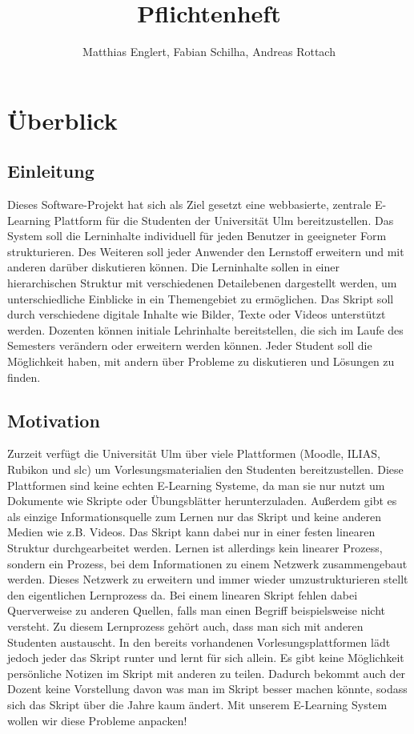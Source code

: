 \documentclass[12pt,a4paper]{article}
\author{Matthias Englert, Fabian Schilha, Andreas Rottach}
\title{Pflichtenheft}
\begin{document}
\maketitle
\newpage
\tableofcontents
\newpage
\section{Überblick}
\subsection{Einleitung}
Dieses Software-Projekt hat sich als Ziel gesetzt eine webbasierte, zentrale E-Learning Plattform für die Studenten der Universität Ulm bereitzustellen. Das System soll die Lerninhalte individuell für jeden Benutzer in geeigneter Form strukturieren. Des Weiteren soll jeder Anwender den Lernstoff erweitern und mit anderen darüber diskutieren können. Die Lerninhalte sollen in einer hierarchischen Struktur mit verschiedenen Detailebenen dargestellt werden, um unterschiedliche Einblicke in ein Themengebiet zu ermöglichen. Das Skript soll durch verschiedene digitale Inhalte wie Bilder, Texte oder Videos unterstützt werden. Dozenten können initiale Lehrinhalte bereitstellen, die sich im Laufe des Semesters verändern oder erweitern werden können. 
Jeder Student soll die Möglichkeit haben, mit andern über Probleme zu diskutieren und Lösungen zu finden.

\subsection{Motivation}
Zurzeit verfügt die Universität Ulm über viele Plattformen (Moodle, ILIAS, Rubikon und slc) um Vorlesungsmaterialien den Studenten bereitzustellen. Diese Plattformen sind keine echten E-Learning Systeme, da man sie nur nutzt um Dokumente wie Skripte oder Übungsblätter herunterzuladen. Außerdem gibt es als einzige Informationsquelle zum Lernen nur das Skript und keine anderen Medien wie z.B. Videos. Das Skript kann dabei nur in einer festen linearen Struktur durchgearbeitet werden. Lernen ist allerdings kein linearer Prozess, sondern ein Prozess, bei dem Informationen zu einem Netzwerk zusammengebaut werden. Dieses Netzwerk zu erweitern und immer wieder umzustrukturieren stellt den eigentlichen Lernprozess da. Bei einem linearen Skript fehlen dabei Querverweise zu anderen Quellen, falls man einen Begriff beispielsweise nicht versteht. Zu diesem Lernprozess gehört auch, dass man sich mit anderen Studenten austauscht. In den bereits vorhandenen Vorlesungsplattformen lädt jedoch jeder das Skript runter und lernt für sich allein. Es gibt keine Möglichkeit persönliche Notizen im Skript mit anderen zu teilen. Dadurch bekommt auch der Dozent keine Vorstellung davon was man im Skript besser machen könnte, sodass sich das Skript über die Jahre kaum ändert.
Mit unserem E-Learning System wollen wir diese Probleme anpacken! 
\end{document}
